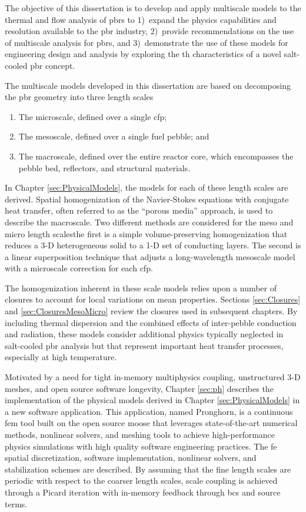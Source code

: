 The objective of this dissertation is to develop and apply multiscale models to the thermal and flow analysis of \glspl{pbr} to 1)~expand the physics capabilities and resolution available to the \gls{pbr} industry, 2)~provide recommendations on the use of multiscale analysis for \glspl{pbr}, and 3)~demonstrate the use of these models for engineering design and analysis by exploring the \gls{th} characteristics of a novel salt-cooled \gls{pbr} concept.

The multiscale models developed in this dissertation are based on decomposing the \gls{pbr} geometry into three length scales\mdash

\begin{enumerate}
\item The microscale, defined over a single \gls{cfp};
\item The mesoscale, defined over a single fuel pebble; and
\item The macroscale, defined over the entire reactor core, which encompasses the pebble bed, reflectors, and structural materials.
\end{enumerate}

In Chapter \ref{sec:PhysicalModels}, the models for each of these length scales are derived. Spatial homogenization of the Navier-Stokes equations with conjugate heat transfer, often referred to as the ``porous media'' approach, is used to describe the macroscale. Two different methods are considered for the meso and micro length scales\mdash the first is a simple volume-preserving homogenization that reduces a 3-D heterogeneous solid to a 1-D set of conducting layers. The second is a linear superposition technique that adjusts a long-wavelength mesoscale model with a microscale correction for each \gls{cfp}. 

The homogenization inherent in these scale models relies upon a number of closures to account for local variations on mean properties. Sections \ref{sec:Closures} and \ref{sec:ClosuresMesoMicro} review the closures used in subsequent chapters. By including thermal dispersion and the combined effects of inter-pebble conduction and radiation, these models consider additional physics typically neglected in salt-cooled \gls{pbr} analysis \cite{xin_wang_thesis,scarlat} but that represent important heat transfer processes, especially at high temperature. 

Motivated by a need for tight in-memory multiphysics coupling, unstructured 3-D meshes, and open source software longevity, Chapter \ref{sec:ph} describes the implementation of the physical models derived in Chapter \ref{sec:PhysicalModels} in a new software application. This application, named Pronghorn, is a continuous \gls{fem} tool built on the open source \gls{moose} that leverages state-of-the-art numerical methods, nonlinear solvers, and meshing tools to achieve high-performance physics simulations with high quality software engineering practices. The \gls{fe} spatial discretization, software implementation, nonlinear solvers, and stabilization schemes are described. By assuming that the fine length scales are periodic with respect to the coarser length scales, scale coupling is achieved through a Picard iteration with in-memory feedback through \glspl{bc} and source terms. 

